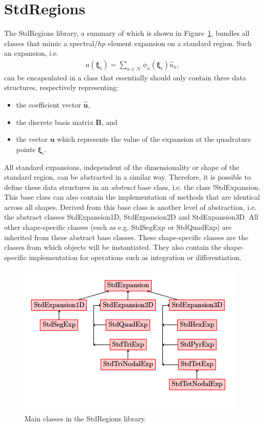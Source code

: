 \section{StdRegions}
The StdRegions library, a summary of which is shown in
Figure~\ref{f:library:stdregions}, bundles all classes that mimic a
spectral/$hp$ element expansion on a standard region. Such an expansion, i.e.
\begin{align*}
u(\boldsymbol{\xi}_i) =
  \sum_{n\in\mathcal{N}}\phi_n(\boldsymbol{\xi}_i)\hat{u}_n,
\end{align*}
can be encapsulated in a class that essentially should only contain three data
structures, respectively representing:

\begin{itemize}
\item the coefficient vector $\hat{\boldsymbol{u}}$,
\item the discrete basis matrix $\boldsymbol{B}$, and
\item the vector $\boldsymbol{u}$ which represents the value of the expansion
at the quadrature points $\boldsymbol{\xi}_i$.
\end{itemize}

All standard expansions, independent of the dimensionality or shape of the
standard region, can be abstracted in a similar way. Therefore, it is possible
to define these data structures in an \emph{abstract} base class, i.e. the class
!StdExpansion. This base class can also contain the implementation of methods
that are identical across all shapes. Derived from this base class is another
level of abstraction, i.e. the abstract classes StdExpansion1D, StdExpansion2D
and StdExpansion3D. All other shape-specific classes (such as e.g. StdSegExp or
StdQuadExp) are inherited from these abstract base classes. These shape-specific
classes are the classes from which objects will be instantiated.
They also contain the shape-specific implementation for operations such as
integration or differentiation.

\begin{figure}
\centering
\includegraphics[width=\textwidth]{img/StdRegions.png}
\caption{Main classes in the StdRegions library.}
\label{f:library:stdregions}
\end{figure}

